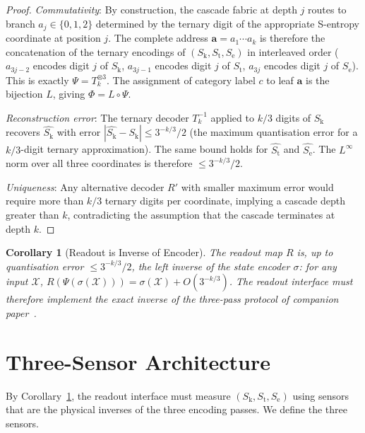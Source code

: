 \documentclass[11pt,twocolumn,a4paper]{article}
\newtheorem{corollary}[theorem]{Corollary}
\theoremstyle{definition}
\theoremstyle{remark}
\newcommand{\Sk}{S_{\mathrm{k}}}
\newcommand{\St}{S_{\mathrm{t}}}
\newcommand{\Se}{S_{\mathrm{e}}}
\begin{document}
\begin{proof}
\textit{Commutativity}: By construction, the cascade fabric at depth $j$
routes to branch $a_j \in \{0,1,2\}$ determined by the ternary digit of the
appropriate S-entropy coordinate at position $j$. The complete address
$\mathbf{a} = a_1 \cdots a_k$ is therefore the concatenation of the ternary
encodings of $(\Sk, \St, \Se)$ in interleaved order
($a_{3j-2}$ encodes digit $j$ of $\Sk$, $a_{3j-1}$ encodes digit $j$ of $\St$,
$a_{3j}$ encodes digit $j$ of $\Se$). This is exactly $\Psi = T_k^{\otimes 3}$.
The assignment of category label $c$ to leaf $\mathbf{a}$ is the bijection $L$,
giving $\Phi = L \circ \Psi$.

\textit{Reconstruction error}: The ternary decoder $T_k^{-1}$ applied to
$k/3$ digits of $\Sk$ recovers $\hat{\Sk}$ with error
$|\hat{\Sk} - \Sk| \leq 3^{-k/3}/2$ (the maximum quantisation error for
a $k/3$-digit ternary approximation). The same bound holds for $\hat{\St}$
and $\hat{\Se}$. The $L^\infty$ norm over all three coordinates is therefore
$\leq 3^{-k/3}/2$.

\textit{Uniqueness}: Any alternative decoder $R'$ with smaller maximum error
would require more than $k/3$ ternary digits per coordinate, implying a cascade
depth greater than $k$, contradicting the assumption that the cascade terminates
at depth $k$.
\end{proof}

\begin{corollary}[Readout is Inverse of Encoder]
\label{cor:inverse}
The readout map $R$ is, up to quantisation error $\leq 3^{-k/3}/2$, the left
inverse of the state encoder $\sigma$: for any input $\mathcal{X}$,
$R(\Psi(\sigma(\mathcal{X}))) = \sigma(\mathcal{X}) + O(3^{-k/3})$.
The readout interface must therefore implement the exact inverse of the
three-pass protocol of companion paper~\citep{companion2}.
\end{corollary}

\section{Three-Sensor Architecture}
\label{sec:sensors}

By Corollary~\ref{cor:inverse}, the readout interface must measure
$(\Sk, \St, \Se)$ using sensors that are the physical inverses of the three
encoding passes. We define the three sensors.
\end{document}
